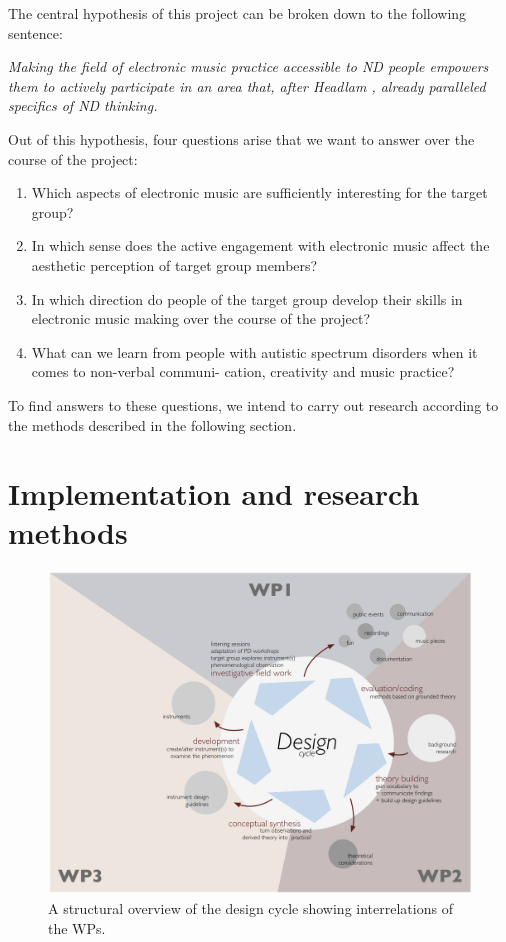 \documentclass{chi-ext}
\begin{document}
\begin{multicols}{2}

The central hypothesis of this project can be broken down to the following sentence: 

\emph{Making the field of electronic music practice accessible to ND people empowers them to actively participate in an area that, after Headlam \cite{headlam2006-lea}, already paralleled specifics of ND thinking.}

Out of this hypothesis, four questions arise that we want to answer over the course of the project:

\begin{enumerate}
	\item Which aspects of electronic music are sufficiently interesting for the target group?
	\item In which sense does the active engagement with electronic music affect the aesthetic perception of target group members?
	\item In which direction do people of the target group develop their skills in electronic music making over the course of the project?
	\item What can we learn from people with autistic spectrum disorders when it comes to non-verbal communi- cation, creativity and music practice?
\end{enumerate}

To find answers to these questions, we intend to carry out research according to the methods described in the following section.

\section{Implementation and research methods}
\label{sec:timeline}

\begin{figure}
	\includegraphics[width=\columnwidth]{media/DEINDDesignCycle.pdf}
	\caption{A structural overview of the design cycle showing interrelations of the WPs.}
	\label{fig:Designcycle}
\end{figure}


\end{multicols}
\end{document}

